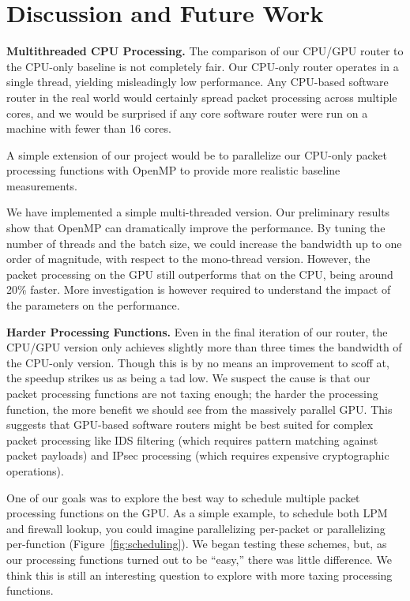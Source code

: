 \section{Discussion and Future Work}
\label{sec:disc}

\noindent \textbf{Multithreaded CPU Processing.} The comparison of our CPU/GPU
router to the CPU-only baseline is not completely fair. Our CPU-only router
operates in a single thread, yielding misleadingly low performance. Any
CPU-based software router in the real world would certainly spread packet
processing across multiple cores, and we would be surprised if any core
software router were run on a machine with fewer than 16 cores.

A simple extension of our project would be to parallelize our CPU-only packet
processing functions with OpenMP to provide more realistic baseline
measurements.

We have implemented a simple multi-threaded version. Our preliminary results show that OpenMP can dramatically improve the performance. By tuning the number of threads and the batch size, we could increase the bandwidth up to one order of magnitude, with respect to the mono-thread version. However, the packet processing on the GPU still outperforms that on the CPU, being around 20\% faster. More investigation is however required to understand the impact of the parameters on the performance.

\medskip \noindent \textbf{Harder Processing Functions.} Even in the final
iteration of our router, the CPU/GPU version only achieves slightly more than
three times the bandwidth of the CPU-only version. Though this is by no means
an improvement to scoff at, the speedup strikes us as being a tad low. We
suspect the cause is that our packet processing functions are not taxing
enough; the harder the processing function, the more benefit we should see from
the massively parallel GPU. This suggests that GPU-based software routers might
be best suited for complex packet processing like IDS filtering (which requires
pattern matching against packet payloads) and IPsec processing (which requires
expensive cryptographic operations).

One of our goals was to explore the best way to schedule multiple packet
processing functions on the GPU. As a simple example, to schedule both LPM and
firewall lookup, you could imagine parallelizing per-packet or parallelizing
per-function (Figure~\ref{fig:scheduling}). We began testing these schemes,
but, as our processing functions turned out to be ``easy,'' there was little
difference. We think this is still an interesting question to explore with more
taxing processing functions.

